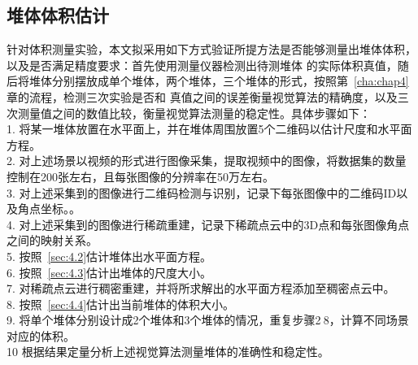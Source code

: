 \subsection{堆体体积估计}
针对体积测量实验，本文拟采用如下方式验证所提方法是否能够测量出堆体体积，以及是否满足精度要求：首先使用测量仪器检测出待测堆体
的实际体积真值，随后将堆体分别摆放成单个堆体，两个堆体，三个堆体的形式，按照第~\ref{cha:chap4}章的流程，检测三次实验是否和
真值之间的误差衡量视觉算法的精确度，以及三次测量值之间的数值比较，衡量视觉算法测量的稳定性。具体步骤如下：\\
1. 将某一堆体放置在水平面上，并在堆体周围放置5个二维码以估计尺度和水平面方程。\\
2. 对上述场景以视频的形式进行图像采集，提取视频中的图像，将数据集的数量控制在200张左右，且每张图像的分辨率在50万左右。\\
3. 对上述采集到的图像进行二维码检测与识别，记录下每张图像中的二维码ID以及角点坐标。。\\
4. 对上述采集到的图像进行稀疏重建，记录下稀疏点云中的3D点和每张图像角点之间的映射关系。\\
5. 按照~\ref{sec:4.2}估计堆体出水平面方程。\\
6. 按照~\ref{sec:4.3}估计出堆体的尺度大小。\\
7. 对稀疏点云进行稠密重建，并将所求解出的水平面方程添加至稠密点云中。\\
8. 按照~\ref{sec:4.4}估计出当前堆体的体积大小。\\
9. 将单个堆体分别设计成2个堆体和3个堆体的情况，重复步骤2$~$8，计算不同场景对应的体积。\\
10 根据结果定量分析上述视觉算法测量堆体的准确性和稳定性。

